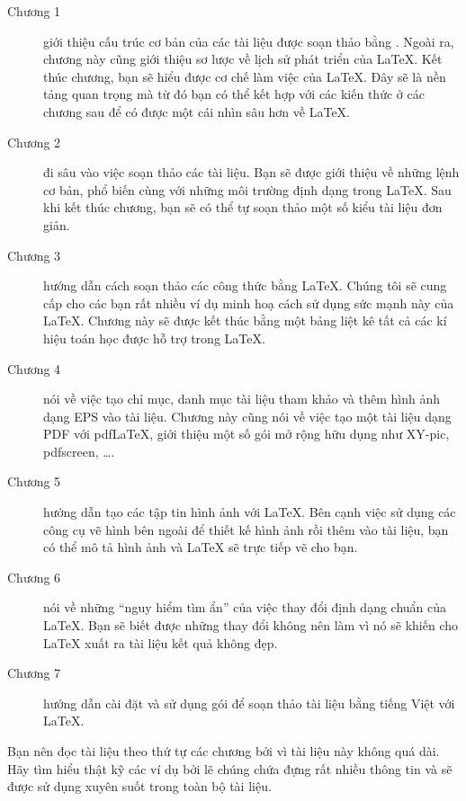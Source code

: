 \begin{description}
\item[Chương 1] giới thiệu cấu trúc cơ bản của các tài liệu được soạn thảo bằng \LaTeXe{}. Ngoài ra, chương này cũng giới
thiệu sơ lược về lịch sử phát triển của \LaTeX{}. Kết thúc chương,
bạn sẽ hiểu được cơ chế làm việc của \LaTeX{}. Đây sẽ là nền tảng
quan trọng mà từ đó bạn có thể kết hợp với các kiến thức ở các chương
sau để có được một cái nhìn sâu hơn về \LaTeX{}.

\item[Chương 2] đi sâu vào việc soạn thảo các tài liệu. Bạn sẽ được giới thiệu về những lệnh cơ bản, phổ biến cùng với những môi trường định dạng trong \LaTeX{}. Sau khi kết thúc
chương, bạn sẽ có thể tự soạn thảo một số kiểu tài liệu đơn giản.

\item[Chương 3] hướng dẫn cách soạn thảo các công thức bằng \LaTeX.
Chúng tôi sẽ cung cấp cho các bạn rất nhiều ví dụ minh hoạ cách sử
dụng sức mạnh này của \LaTeX{}. Chương này sẽ được kết thúc bằng
một bảng liệt kê tất cả các kí hiệu toán học được hỗ trợ trong
\LaTeX{}.

\item[Chương 4] nói về việc tạo chỉ mục, danh mục tài liệu tham
khảo và thêm hình ảnh dạng EPS vào tài liệu. Chương này cũng nói về việc
tạo một tài liệu dạng PDF với pdf\LaTeX{}, giới thiệu một số gói
mở rộng hữu dụng như XY-pic, pdfscreen, \ldots .

\item[Chương 5] hướng dẫn tạo các tập tin hình ảnh với \LaTeX{}. Bên cạnh việc sử dụng các công cụ vẽ hình bên ngoài để thiết kế hình ảnh rồi thêm vào tài liệu, bạn có thể mô tả hình ảnh và \LaTeX{} sẽ trực tiếp vẽ cho bạn.

\item[Chương 6] nói về những ``nguy hiểm tìm ẩn'' của việc thay đổi
định dạng chuẩn của \LaTeX{}. Bạn sẽ biết được những thay đổi
không nên làm vì nó sẽ khiến cho \LaTeX{} xuất ra tài liệu kết quả
không đẹp.

\item[Chương 7] hướng dẫn cài đặt và sử dụng gói  để
soạn thảo tài liệu bằng tiếng Việt với \LaTeX{}.
\end{description}

\bigskip
\noindent Bạn nên đọc tài liệu theo thứ tự các chương bởi vì tài
liệu này không quá dài. Hãy tìm hiểu thật kỹ các ví dụ bởi lẽ chúng chứa đựng rất nhiều thông tin và sẽ được sử dụng xuyên suốt trong toàn bộ tài liệu.

